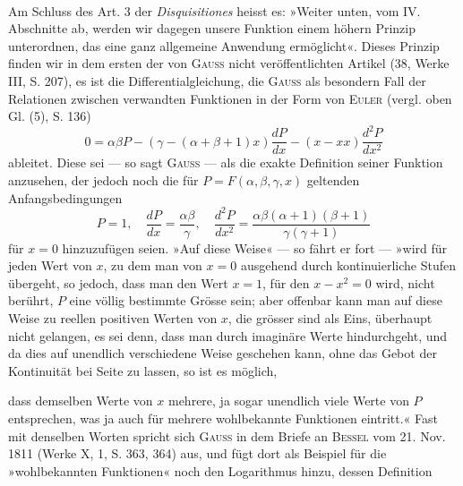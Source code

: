 \par\medskip
\begin{center}
\\
\end{center}
\noindent\hspace*{\parindent}Am Schluss des Art. 3 der \textit{Disquisitiones} heisst es: »Weiter unten, vom
IV. Abschnitte ab, werden wir dagegen unsere Funktion einem höhern Prinzip
unterordnen, das eine ganz allgemeine Anwendung ermöglicht«. Dieses
Prinzip finden wir in dem ersten der von \textsc{Gauss} nicht veröffentlichten Artikel
(38, Werke III, S. 207), es ist die Differentialgleichung, die \textsc{Gauss} als besondern
Fall der Relationen zwischen verwandten Funktionen in der Form von
\textsc{Euler} (vergl. oben Gl. (5), S. 136)
\begingroup\makeatletter\tagsleft@true\let\veqno\leqno\makeatother
\begin{equation*}
0=\alpha\beta P-(\gamma-(\alpha+\beta+1)x)\frac{dP}{dx}
-(x-xx)\frac{d^2P}{dx^2}\tag{5\,a}
\end{equation*}\endgroup
\noindent ableitet. Diese sei — so sagt \textsc{Gauss} — als die exakte Definition seiner
Funktion anzusehen, der jedoch noch die für \(P=F(\alpha,\beta,\gamma,x)\) geltenden Anfangsbedingungen
\[
P=1,\quad \frac{dP}{dx}=\frac{\alpha\beta}{\gamma},\quad
\frac{d^2P}{dx^2}=\frac{\alpha\beta(\alpha+1)(\beta+1)}{\gamma(\gamma+1)}
\]
für \(x=0\) hinzuzufügen seien. »Auf diese Weise« — so fährt er fort — »wird
für jeden Wert von \(x\), zu dem man von \(x=0\) ausgehend durch kontinuierliche
Stufen übergeht, so jedoch, dass man den Wert \(x=1\), für den \(x-x^2=0\)
wird, nicht berührt, \(P\) eine völlig bestimmte Grösse sein; aber offenbar kann
man auf diese Weise zu reellen positiven Werten von \(x\), die grösser sind
als Eins, überhaupt nicht gelangen, es sei denn, dass man durch imaginäre
Werte hindurchgeht, und da dies auf unendlich verschiedene Weise geschehen
kann, ohne das Gebot der Kontinuität bei Seite zu lassen, so ist es möglich,\par
\clearpage{}
\noindent dass demselben Werte von \(x\) mehrere, ja sogar unendlich viele Werte von \(P\)
entsprechen, was ja auch für mehrere wohlbekannte Funktionen eintritt.«
Fast mit denselben Worten spricht sich \textsc{Gauss} in dem Briefe an \textsc{Bessel} vom
21. Nov. 1811 (Werke X, 1, S. 363, 364) aus, und fügt dort als Beispiel für
die »wohlbekannten Funktionen« noch den Logarithmus hinzu, dessen Definition
